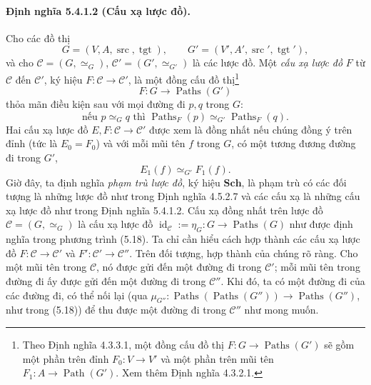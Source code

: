 \paragraph{Định nghĩa 5.4.1.2 (Cấu xạ lược đồ).} Cho các đồ thị
\[G=(V,A,\operatorname{src},\operatorname{tgt}),\qquad G'=(V',A',\operatorname{src}',\operatorname{tgt}'),\]
và cho $\mathcal C=(G,\simeq_G)$, $\mathcal C'=(G',\simeq_{G'})$ là các lược đồ. Một \emph{cấu xạ lược đồ} $F$ từ $\mathcal C$ đến $\mathcal C'$, ký hiệu $F:\mathcal C\to\mathcal C'$, là một đồng cấu đồ thị\footnote{Theo Định nghĩa 4.3.3.1, một đồng cấu đồ thị $F:G\to\operatorname{Paths}(G')$ sẽ gồm một phần trên đỉnh $F_0:V\to V'$ và một phần trên mũi tên $F_1:A\to\operatorname{Path}(G')$. Xem thêm Định nghĩa 4.3.2.1.}
\[F:G\longrightarrow\operatorname{Paths}(G')\]
thỏa mãn điều kiện sau với mọi đường đi $p,q$ trong $G$:
\begin{equation*}\text{nếu }p\simeq_G q\text{ thì }\operatorname{Paths}_F(p)\simeq_{G'}\operatorname{Paths}_F(q).\tag{5.20}\end{equation*}
Hai cấu xạ lược đồ $E,F:\mathcal C\to\mathcal C'$ được xem là đồng nhất nếu chúng đồng ý trên đỉnh (tức là $E_0=F_0$) và với mỗi mũi tên $f$ trong $G$, có một tương đương đường đi trong $G'$,
\[E_1(f)\simeq_{G'}F_1(f).\]
Giờ đây, ta định nghĩa \emph{phạm trù lược đồ}, ký hiệu $\mathbf{Sch}$, là phạm trù có các đối tượng là những lược đồ như trong Định nghĩa 4.5.2.7 và các cấu xạ là những cấu xạ lược đồ như trong Định nghĩa 5.4.1.2. Cấu xạ đồng nhất trên lược đồ $\mathcal C=(G,\simeq_G)$ là cấu xạ lược đồ $\operatorname{id}_{\mathcal C}:=\eta_G:G\to\operatorname{Paths}(G)$ như được định nghĩa trong phương trình (5.18). Ta chỉ cần hiểu cách hợp thành các cấu xạ lược đồ $F:\mathcal C\to\mathcal C'$ và $F':\mathcal C'\to\mathcal C''$. Trên đối tượng, hợp thành của chúng rõ ràng. Cho một mũi tên trong $\mathcal C$, nó được gửi đến một đường đi trong $\mathcal C'$; mỗi mũi tên trong đường đi ấy được gửi đến một đường đi trong $\mathcal C''$. Khi đó, ta có một đường đi của các đường đi, có thể nối lại (qua $\mu_{G''}:\operatorname{Paths}(\operatorname{Paths}(G''))\to\operatorname{Paths}(G'')$, như trong (5.18)) để thu được một đường đi trong $\mathcal C''$ như mong muốn.
